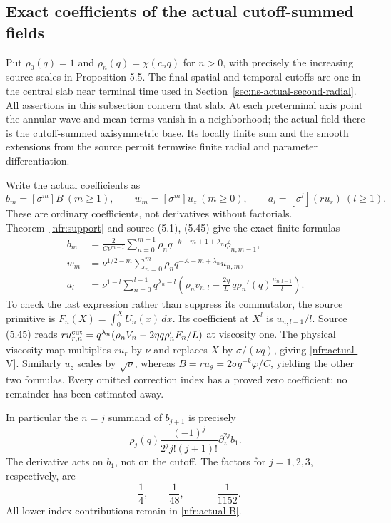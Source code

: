 \subsection{Exact coefficients of the actual cutoff-summed fields}

Put \(\rho_0(q)=1\) and \(\rho_n(q)=\chi(c_nq)\) for \(n>0\),
with precisely the increasing source scales in Proposition 5.5.
The final spatial and temporal cutoffs are one in the central slab near
terminal time used in Section~\ref{sec:ns-actual-second-radial}.
All assertions in this subsection concern that slab. At each preterminal
axis point the annular wave and mean terms vanish in a neighborhood;
the actual field there is the cutoff-summed axisymmetric base. Its
locally finite sum and the smooth extensions from the source permit
termwise finite radial and parameter differentiation.

Write the actual coefficients as
\[
 b_m=[\sigma^m]B\ (m\geq1),\qquad
 w_m=[\sigma^m]u_z\ (m\geq0),\qquad
 a_l=[\sigma^l](ru_r)\ (l\geq1).
\]
These are ordinary coefficients, not derivatives without factorials.
Theorem~\ref{nfr:support} and source (5.1), (5.45) give the exact finite
formulas
\begin{align}
 b_m&=\frac2{C\nu^{m-1}}\sum_{n=0}^{m-1}
       \rho_n q^{-k-m+1+\lambda_n}\phi_{n,m-1},
       \label{nfr:actual-B}\\
 w_m&=\nu^{1/2-m}\sum_{n=0}^{m}
       \rho_n q^{-A-m+\lambda_n}u_{n,m},
       \label{nfr:actual-U}\\
 a_l&=\nu^{1-l}\sum_{n=0}^{l-1}q^{\lambda_n-l}
       \left(\rho_n v_{n,l}
          -\frac{2\eta}{L}\,q\rho_n'(q)\frac{u_{n,l-1}}l\right).
       \label{nfr:actual-V}
\end{align}
To check the last expression rather than suppress its commutator, the
source primitive is \(F_n(X)=\int_0^XU_n(x)\,dx\). Its coefficient
at \(X^l\) is \(u_{n,l-1}/l\). Source (5.45) reads
\(ru_{r,n}^{\rm cut}=q^{\lambda_n}
(\rho_nV_n-2\eta q\rho_n'F_n/L)\) at viscosity one.
The physical viscosity map multiplies \(ru_r\) by \(\nu\)
and replaces \(X\) by \(\sigma/(\nu q)\), giving
\eqref{nfr:actual-V}. Similarly \(u_z\) scales by \(\sqrt\nu\),
whereas \(B=ru_\theta=2\sigma q^{-k}\varphi/C\), yielding the
other two formulas. Every omitted correction index has a proved zero
coefficient; no remainder has been estimated away.

In particular the \(n=j\) summand of \(b_{j+1}\) is precisely
\begin{equation}\label{nfr:physical-diagonal}
 \rho_j(q)\frac{(-1)^j}{2^j j!(j+1)!}\partial_z^{2j}b_1.
\end{equation}
The derivative acts on \(b_1\), not on the cutoff. The factors for
\(j=1,2,3\), respectively, are
\[
 -\frac14,\qquad \frac1{48},\qquad -\frac1{1152}.
\]
All lower-index contributions remain in \eqref{nfr:actual-B}.

